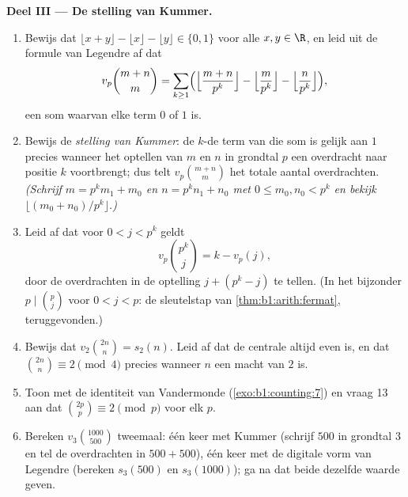 \begin{problem}
\medskip
\noindent\textbf{Deel III --- De stelling van Kummer.}
\begin{enumerate}[resume]
  \item Bewijs dat $\lfloor x + y \rfloor - \lfloor x \rfloor - \lfloor y
        \rfloor \in \{0, 1\}$ voor alle $x, y \in \R$, en leid uit de
        formule van Legendre af dat
        \[
        v_p\binom{m+n}m
        = \sum_{k\geq1}\Bigl(
        \Bigl\lfloor\frac{m+n}{p^k}\Bigr\rfloor
        - \Bigl\lfloor\frac{m}{p^k}\Bigr\rfloor
        - \Bigl\lfloor\frac{n}{p^k}\Bigr\rfloor\Bigr),
        \]
        een som waarvan elke term $0$ of $1$ is.
  \item Bewijs de \emph{stelling van Kummer}: de $k$-de term van die som
        is gelijk aan $1$ precies wanneer het optellen van $m$ en $n$ in
        grondtal $p$ een overdracht naar positie $k$ voortbrengt; dus
        telt $v_p\binom{m+n}m$ het totale aantal overdrachten.
        \emph{(Schrijf $m = p^km_1 + m_0$ en $n = p^kn_1 + n_0$ met $0
        \leq m_0, n_0 < p^k$ en bekijk $\lfloor (m_0 + n_0)/p^k
        \rfloor$.)}
  \item Leid af dat voor $0 < j < p^k$ geldt
        \[
        v_p\binom{p^k}{j} = k - v_p(j) ,
        \]
        door de overdrachten in de optelling $j + (p^k - j)$ te tellen.
        (In het bijzonder $p \mid \binom p j$ voor $0 < j < p$: de
        sleutelstap van \cref{thm:b1:arith:fermat}, teruggevonden.)
  \item Bewijs dat $v_2\binom{2n}n = s_2(n)$. Leid af dat de centrale
         altijd even is, en dat $\binom{2n}n \equiv 2
        \pmod 4$ precies wanneer $n$ een macht van $2$ is.
  \item Toon met de identiteit van Vandermonde
        (\cref{exo:b1:counting:7}) en vraag 13 aan dat $\binom{2p}p
        \equiv 2 \pmod p$ voor elk  $p$.
  \item Bereken $v_3\binom{1000}{500}$ tweemaal: één keer met Kummer
        (schrijf $500$ in grondtal $3$ en tel de overdrachten in $500 +
        500$), één keer met de digitale vorm van Legendre (bereken
        $s_3(500)$ en $s_3(1000)$); ga na dat beide dezelfde waarde
        geven.
\end{enumerate}


\end{problem}
